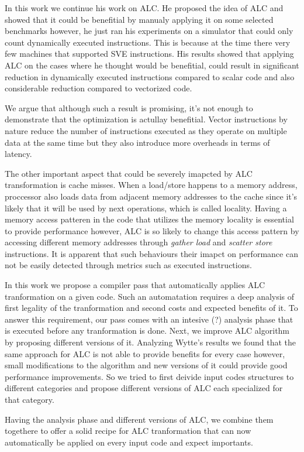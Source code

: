 \documentclass[\main/thesis.tex]{subfiles}
\begin{document}
In this work we continue his work on ALC. He proposed the idea of ALC and showed that it could be benefitial by manualy applying it on some selected benchmarks however, he just ran his experiments on a simulator that could only count dynamically executed instructions. This is because at the time there very few machines 
that supported SVE instructions. His results showed that applying ALC on the cases where he thought would be benefitial, could result in significant reduction in dynamically executed instructions compared to scalar code and also considerable reduction compared to vectorized code.

We argue that although such a result is promising, it's not enough to demonstrate that the optimization is actullay benefitial. Vector instructions by nature reduce the number of instructions executed as they operate on multiple data at the same time but they also introduce more overheads in terms of latency. 

The other important aspect that could be severely imapcted by ALC transformation is cache misses. When a load/store happens to a memory address, proccessor also loads data from adjacent memory addresses to the cache since it's likely that it will be used by next operations, which is called locality. Having a memory access patteren in the code that 
utilizes the memory locality is essential to provide performance however, ALC is so likely to change this access pattern by accessing different memory addresses through \emph{gather load} and \emph{scatter store} instructions. It is apparent that such behaviours their imapct on performance can not be easily detected through metrics such as executed instructions.

In this work we propose a compiler pass that automatically applies ALC tranformation on a given code. Such an automatation requires a deep analysis of first legality of the tranformation and second costs and expected benefits of it. To answer this requirement, our pass comes with an intesive (?) analysis phase that is executed before any tranformation is done. Next, 
we improve ALC algorithm by proposing different versions of it. Analyzing Wytte's results we found that the same approach for ALC is not able to provide benefits for every case however, small modifications to the algorithm and new versions of it could provide good performance improvements. So we tried to first deivide input codes structures to different categories and
propose different versions of ALC each specialized for that category.

Having the analysis phase and different versions of ALC, we combine them togethere to offer a solid recipe for ALC tranformation that can now automatically be applied on every input code and expect importants.
\end{document}
